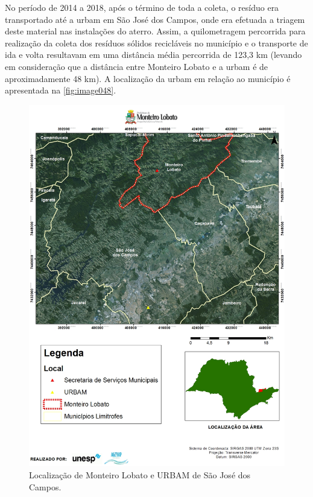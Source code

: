 No período de 2014 a 2018, após o término de toda a coleta, o resíduo era transportado até a \gls{urbam} em São José dos Campos, onde era efetuada a triagem deste material nas instalações do aterro. Assim, a quilometragem percorrida para realização da coleta dos resíduos sólidos recicláveis no município e o transporte de ida e volta resultavam em uma distância média percorrida de 123,3 km (levando em consideração que a distância entre Monteiro Lobato e a \gls{urbam} é de aproximadamente 48 km). A localização da \gls{urbam} em relação ao município é apresentada na \autoref{fig:image048}.

\begin{figure}
	\centering
	\includegraphics[width=1\linewidth]{produtos/prodtres/image048}
	\caption{Localização de Monteiro Lobato e URBAM de São José dos Campos.}
	\label{fig:image048}
\end{figure}

